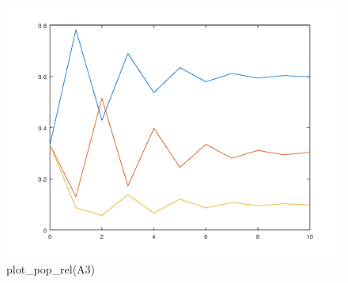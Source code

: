 \documentclass{article}
\begin{document}
\begin{figure}[H]
\centering
\includegraphics[scale=0.5]{plotrelA3.png}
\caption{plot\_pop\_rel(A3)}
\label{fig:universe}
\end{figure}

\subsection{}
\end{document}
